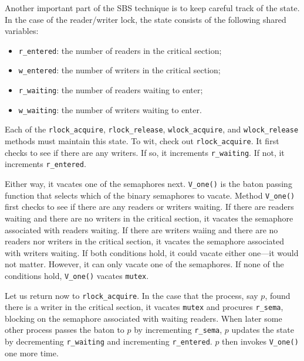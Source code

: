 \documentclass{report}
\begin{document}
Another important part of the SBS technique is to keep careful track of the
state.  In the case of the reader/writer lock, the state consists of the
following shared variables:
\begin{itemize}
\item \texttt{r\_entered}: the number of readers in the critical section;
\item \texttt{w\_entered}: the number of writers in the critical section;
\item \texttt{r\_waiting}: the number of readers waiting to enter;
\item \texttt{w\_waiting}: the number of writers waiting to enter.
\end{itemize}
Each of the
\texttt{rlock\_acquire}, \texttt{rlock\_release},
\texttt{wlock\_acquire}, and \texttt{wlock\_release} methods must maintain
this state.
To wit, check out \texttt{rlock\_acquire}.  It first checks to see if there
are any writers.  If so, it increments \texttt{r\_waiting}.  If not,
it increments \texttt{r\_entered}.

Either way, it vacates one of the semaphores next.
\texttt{V\_one()} is the baton passing function that selects which of the
binary semaphores to vacate.
Method \texttt{V\_one()} first checks to see if there are any readers or
writers waiting.  If there are readers waiting and there are no writers
in the critical section, it vacates the semaphore associated with
readers waiting.  If there are writers waiing and there are no readers
nor writers in the critical section, it vacates the semaphore associated
with writers waiting.  If both conditions hold, it could vacate either
one---it would not matter.  However, it can only vacate one of the semaphores.
If none of the conditions hold, \texttt{V\_one()} vacates \texttt{mutex}.

Let us return now to \texttt{rlock\_acquire}. In the case that the process,
say $p$,
found there is a writer in the critical section, it vacates
\texttt{mutex} and procures \texttt{r\_sema},
blocking on the semaphore associated
with waiting readers.  When later some other process passes the baton to
$p$ by incrementing \texttt{r\_sema}, $p$ updates the state by decrementing
\texttt{r\_waiting} and incrementing \texttt{r\_entered}.  $p$
then invokes \texttt{V\_one()} one more time.
\end{document}
